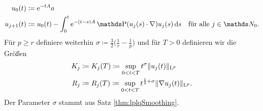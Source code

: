 \begin{align*}
  u_0(t) &\coloneqq \e^{-t A} a \\
  u_{j + 1}(t) &\coloneqq u_0(t) - \int_0^t \e^{-(t - s) A} \PP(u_j(s) \cdot \nabla) u_j(s) \d s \quad\text{für alle } j \in \N_0.
\end{align*}
Für $p \geq r$ definiere weiterhin $\sigma \coloneqq \frac{3}{2} \big( \frac{1}{r} - \frac{1}{p} \big)$ und für $T > 0$ definieren wir die Größen
\begin{align*}
  K_j &\coloneqq K_j(T) \coloneqq \sup_{0 < t < T} t^\sigma \|u_j(t) \|_{\mathrm{L}^p} \\
  R_j &\coloneqq R_j(T) \coloneqq \sup_{0 < t < T} t^{\frac{1}{2} + \sigma} \|\nabla u_j(t) \|_{\mathrm{L}^p}.
\end{align*}
Der Parameter $\sigma$ stammt aus Satz \ref{thm:lplqSmoothing}.

